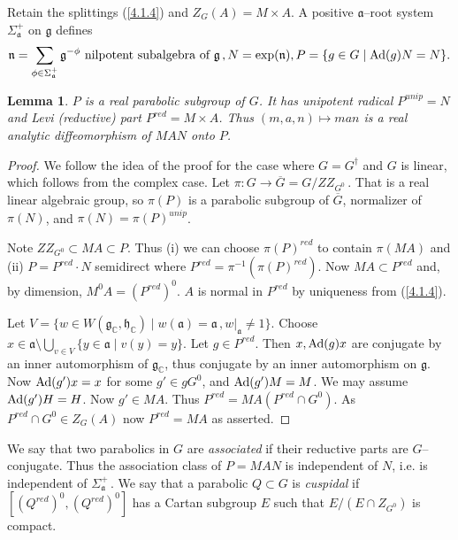 \documentclass{conm-p-l}
\newtheorem{lemma}[equation]{Lemma}
\renewcommand{\gg}{\mathfrak{g}}
\def\ga{\mathfrak{a}}
\def\gg{\mathfrak{g}}
\def\gh{\mathfrak{h}}
\def\gn{\mathfrak{n}}
\def\Ad{{\rm Ad}}
\def\C{\mathbb{C}}
\begin{document}
Retain the splittings (\ref{4.1.4}) and $Z_G(A) = M\times A$.  
A positive $\ga$--root system $\Sigma_\ga^+$ on $\gg$ defines
$$
\gn = \sum_{\phi \in \Sigma_\ga^+}\gg^{-\phi} \text{ nilpotent subalgebra of }
	\gg\,, N = \exp(\gn), P = \{g \in G \mid \Ad(g)N = N\}.
$$
\begin{lemma}\label{4.2.2}
$P$ is a real parabolic subgroup of $G$.  It has unipotent radical
$P^{unip} = N$ and Levi (reductive) part $P^{red} = M\times A$.  Thus
$(m,a,n) \mapsto man$ is a real analytic diffeomorphism of $MAN$ onto $P$.
\end{lemma}
\begin{proof} We follow the idea of the proof for the case where
$G = G^\dagger$ and $G$ is linear, which follows from the complex case.
Let $\pi: G \to \overline{G} = G/ZZ_{G^0}$\,.  That is a real linear
algebraic group, so $\pi(P)$ is a parabolic subgroup of $\overline{G}$,
normalizer of $\pi(N)$, and $\pi(N) = \pi(P)^{unip}$.

Note $ZZ_{G^0} \subset MA \subset P$.  Thus (i) we can choose $\pi(P)^{red}$
to contain $\pi(MA)$ and (ii) $P = P^{red}\cdot N$ semidirect where
$P^{red} = \pi^{-1}(\pi(P)^{red})$.  Now $MA \subset P^{red}$ and, by 
dimension, $M^0A = (P^{red})^0$.  $A$ is normal in $P^{red}$ by uniqueness
from (\ref{4.1.4}).

Let $V = \{w \in W(\gg_\C,\gh_\C) \mid w(\ga) = \ga\,, w|_\ga \ne 1\}$.
Choose $x \in \ga \setminus \bigcup_{v \in V} \{y \in \ga \mid v(y)=y\}$.
Let $g \in P^{red}$.  Then $x, \Ad(g)x$ are conjugate by an inner 
automorphism of $\gg_\C$, thus \cite[Theorem 2.1]{R1972} conjugate by an
inner automorphism on $\gg$.  Now $\Ad(g')x = x$ for some $g' \in gG^0$,
and $\Ad(g')M = M$.  We may assume $\Ad(g')H = H$.  Now $g' \in MA$.  Thus
$P^{red} = MA(P^{red}\cap G^0)$.  As $P^{red}\cap G^0 \in Z_G(A)$ now
$P^{red} = MA$ as asserted.
\end{proof}

We say that two parabolics in $G$ are {\em associated} if their
reductive parts are $G$--conjugate.  Thus the association class of
$P = MAN$ is independent of $N$, i.e. is independent of $\Sigma_\ga^+$\,.
We say that a parabolic $Q \subset G$ is {\em cuspidal} if
$[(Q^{red})^0,(Q^{red})^0]$ has a Cartan subgroup $E$ such that
$E/(E\cap Z_{G^0})$ is compact.
\end{document}
